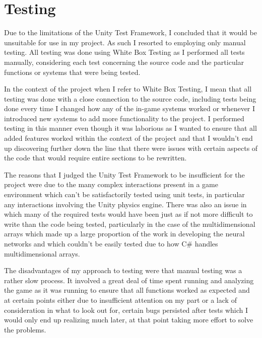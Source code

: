 \section{Testing}
\par
Due to the limitations of the Unity Test Framework, I concluded that it would be unsuitable for use in my project. As such I resorted to employing only manual testing. All testing was done using White Box Testing as I performed all tests manually, considering each test concerning the source code and the particular functions or systems that were being tested.
\par
In the context of the project when I refer to White Box Testing, I mean that all testing was done with a close connection to the source code, including tests being done every time I changed how any of the in-game systems worked or whenever I introduced new systems to add more functionality to the project. I performed testing in this manner even though it was laborious as I wanted to ensure that all added features worked within the context of the project and that I wouldn't end up discovering further down the line that there were issues with certain aspects of the code that would require entire sections to be rewritten.
\par
The reasons that I judged the Unity Test Framework to be insufficient for the project were due to the many complex interactions present in a game environment which can't be satisfactorily tested using unit tests, in particular any interactions involving the Unity physics engine. There was also an issue in which many of the required tests would have been just as if not more difficult to write than the code being tested, particularly in the case of the multidimensional arrays which made up a large proportion of the work in developing the neural networks and which couldn't be easily tested due to how C\# handles multidimensional arrays.
\par
The disadvantages of my approach to testing were that manual testing was a rather slow process. It involved a great deal of time spent running and analyzing the game as it was running to ensure that all functions worked as expected and at certain points either due to insufficient attention on my part or a lack of consideration in what to look out for, certain bugs persisted after tests which I would only end up realizing much later, at that point taking more effort to solve the problems.
